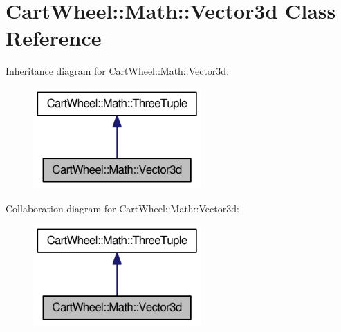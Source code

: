 \hypertarget{classCartWheel_1_1Math_1_1Vector3d}{
\section{CartWheel::Math::Vector3d Class Reference}
\label{classCartWheel_1_1Math_1_1Vector3d}
}


Inheritance diagram for CartWheel::Math::Vector3d:\nopagebreak
\begin{figure}[H]
\begin{center}
\leavevmode
\includegraphics[width=182pt]{classCartWheel_1_1Math_1_1Vector3d__inherit__graph}
\end{center}
\end{figure}


Collaboration diagram for CartWheel::Math::Vector3d:\nopagebreak
\begin{figure}[H]
\begin{center}
\leavevmode
\includegraphics[width=182pt]{classCartWheel_1_1Math_1_1Vector3d__coll__graph}
\end{center}
\end{figure}
